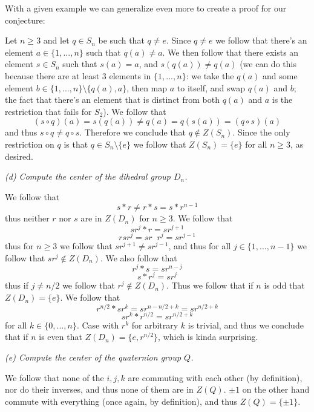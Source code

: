\documentclass[11pt,oneside,titlepage]{book}
\DeclareMathOperator \inv {^{-1}}
\newcommand{\set}[1]{\{ #1 \}}
\begin{document}
With a given example we can generalize even more to create a proof
for our conjecture:

Let $n \geq 3$ and let $q \in S_n$ be such that $q \neq e$. Since $q
\neq e$ we follow that there's an element $a \in \set{1, ..., n}$ such
that $q(a) \neq a$. We then follow that there exists an element $s \in
S_n$ such that $s(a) = a$, and $s(q(a)) \neq q(a)$ (we can do this
because there are at least 3 elements in $\set{1, ..., n}$: we take
the $q(a)$ and some element $b \in \set{1, ..., n} \setminus
\set{q(a), a}$, then map $a$ to itself, and swap $q(a)$ and $b$; the
fact that there's an element that is distinct from both $q(a)$ and $a$
is the restriction that fails for $S_2$). We follow that
$$(s \circ q) (a) = s(q(a)) \neq q(a) = q(s(a)) = (q \circ s) (a)$$
and thus $s \circ q \neq q \circ s$.  Therefore we conclude that $q
\notin Z(S_n)$. Since the only restriction on $q$ is that $q \in S_n
\setminus \set{e}$ we follow that $Z(S_n) = \set{e}$ for all $n \geq
3$, as desired.

\textit{(d) Compute the center of the dihedral group $D_n$.}

We follow that
$$s * r \neq r * s = s * r^{n - 1}$$
thus neither $r$ nor $s$ are in $Z(D_n)$ for $n \geq 3$. We follow
that
$$sr^j * r = sr^{j + 1}$$
$$rsr^j = s r\inv r^j = sr^{j - 1}$$
thus for $n \geq 3$ we follow that $sr^{j + 1} \neq sr^{j - 1}$, and
thus for all $j \in \set{1, ..., n - 1}$ we follow that $sr^j \notin
Z(D_n)$.
We also follow that
$$r^j * s = sr^{n - j}$$
$$s * r^{j} = sr^{j}$$
thus if $j \neq n/2$ we follow that $r^j \notin Z(D_n)$. Thus we
follow that if $n$ is odd that $Z(D_n) = \set{e}$. We follow that
$$r^{n/2} * s r^k = sr^{n - n/2 + k} = sr^{n/2 + k}$$
$$s r^k * r^{n/2} = sr^{n/2 + k}$$
for all $k \in \set{0, ..., n}$. Case with $r^k$ for arbitrary $k$ is
trivial, and thus we conclude that if $n$ is even that $Z(D_n) =
\set{e, r^{n/2}}$, which is kinda surprising.

\textit{(e) Compute the center of the quaternion group $Q$.}

We follow that none of the $i, j, k$ are commuting with each other (by
definition), nor do their inverses, and thus none of them are in
$Z(Q)$. $\pm 1$ on the other hand commute with everything (once again,
by definition), and thus $Z(Q) = \set{\pm 1}$.

\subsection{}
\end{document}

